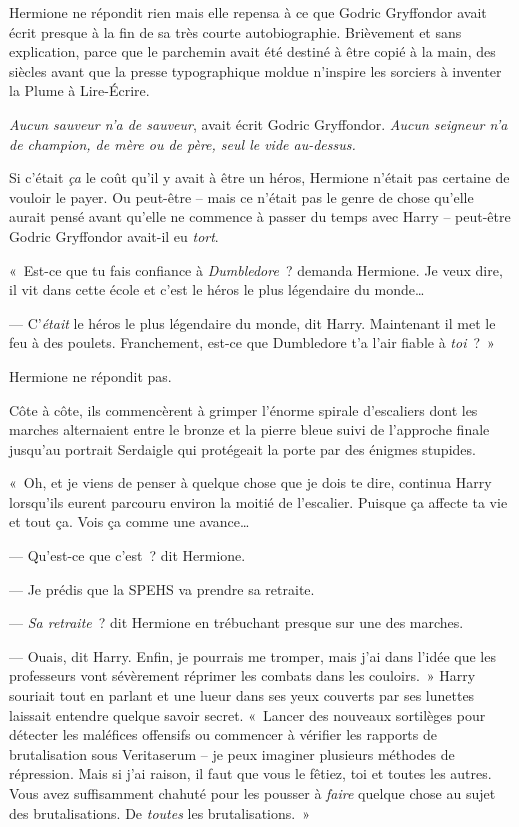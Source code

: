 Hermione ne répondit rien mais elle repensa à ce que Godric Gryffondor avait écrit presque à la fin de sa très courte autobiographie. Brièvement et sans explication, parce que le parchemin avait été destiné à être copié à la main, des siècles avant que la presse typographique moldue n'inspire les sorciers à inventer la Plume à Lire-Écrire.

\emph{Aucun sauveur n'a de sauveur}, avait écrit Godric Gryffondor. \emph{Aucun seigneur n'a de champion, de mère ou de père, seul le vide au-dessus.}

Si c'était \emph{ça} le coût qu'il y avait à être un héros, Hermione n'était pas certaine de vouloir le payer. Ou peut-être -- mais ce n'était pas le genre de chose qu'elle aurait pensé avant qu'elle ne commence à passer du temps avec Harry -- peut-être Godric Gryffondor avait-il eu \emph{tort}.

«~Est-ce que tu fais confiance à \emph{Dumbledore}~? demanda Hermione. Je veux dire, il vit dans cette école et c'est le héros le plus légendaire du monde…

--- C'\emph{était} le héros le plus légendaire du monde, dit Harry. Maintenant il met le feu à des poulets. Franchement, est-ce que Dumbledore t'a l'air fiable à \emph{toi}~?~»

Hermione ne répondit pas.

Côte à côte, ils commencèrent à grimper l'énorme spirale d'escaliers dont les marches alternaient entre le bronze et la pierre bleue suivi de l'approche finale jusqu'au portrait Serdaigle qui protégeait la porte par des énigmes stupides.

«~Oh, et je viens de penser à quelque chose que je dois te dire, continua Harry lorsqu'ils eurent parcouru environ la moitié de l'escalier. Puisque ça affecte ta vie et tout ça. Vois ça comme une avance…

--- Qu'est-ce que c'est~? dit Hermione.

--- Je prédis que la SPEHS va prendre sa retraite.

--- \emph{Sa retraite}~? dit Hermione en trébuchant presque sur une des marches.

--- Ouais, dit Harry. Enfin, je pourrais me tromper, mais j'ai dans l'idée que les professeurs vont sévèrement réprimer les combats dans les couloirs.~» Harry souriait tout en parlant et une lueur dans ses yeux couverts par ses lunettes laissait entendre quelque savoir secret. «~Lancer des nouveaux sortilèges pour détecter les maléfices offensifs ou commencer à vérifier les rapports de brutalisation sous Veritaserum -- je peux imaginer plusieurs méthodes de répression. Mais si j'ai raison, il faut que vous le fêtiez, toi et toutes les autres. Vous avez suffisamment chahuté pour les pousser à \emph{faire} quelque chose au sujet des brutalisations. De \emph{toutes} les brutalisations.~»

